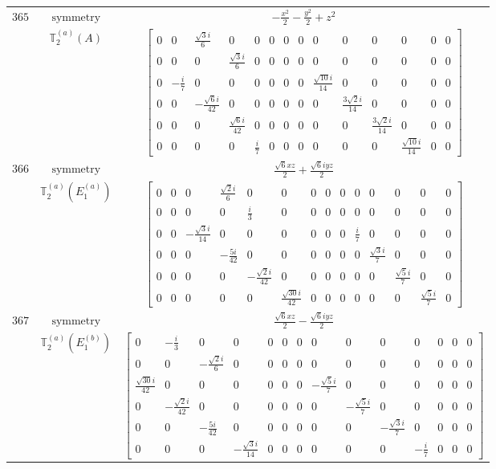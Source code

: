 \documentclass[fleqn,8pt,landscape]{jsarticle}
\begin{document}
\begin{longtable}{ccc}
$ 365 $ & $ \text{symmetry} $ & $ - \frac{x^{2}}{2} - \frac{y^{2}}{2} + z^{2} $ \\
$  $ & $ \mathbb{T}_{2}^{(a)}(A) $ & $ \begin{bmatrix} 0 & 0 & \frac{\sqrt{3} i}{6} & 0 & 0 & 0 & 0 & 0 & 0 & 0 & 0 & 0 & 0 & 0 \\ 0 & 0 & 0 & \frac{\sqrt{3} i}{6} & 0 & 0 & 0 & 0 & 0 & 0 & 0 & 0 & 0 & 0 \\ 0 & - \frac{i}{7} & 0 & 0 & 0 & 0 & 0 & 0 & \frac{\sqrt{10} i}{14} & 0 & 0 & 0 & 0 & 0 \\ 0 & 0 & - \frac{\sqrt{6} i}{42} & 0 & 0 & 0 & 0 & 0 & 0 & \frac{3 \sqrt{2} i}{14} & 0 & 0 & 0 & 0 \\ 0 & 0 & 0 & \frac{\sqrt{6} i}{42} & 0 & 0 & 0 & 0 & 0 & 0 & \frac{3 \sqrt{2} i}{14} & 0 & 0 & 0 \\ 0 & 0 & 0 & 0 & \frac{i}{7} & 0 & 0 & 0 & 0 & 0 & 0 & \frac{\sqrt{10} i}{14} & 0 & 0 \end{bmatrix} $ \\ \hline
$ 366 $ & $ \text{symmetry} $ & $ \frac{\sqrt{6} x z}{2} + \frac{\sqrt{6} i y z}{2} $ \\
$  $ & $ \mathbb{T}_{2}^{(a)}(E_{1}^{(a)}) $ & $ \begin{bmatrix} 0 & 0 & 0 & \frac{\sqrt{2} i}{6} & 0 & 0 & 0 & 0 & 0 & 0 & 0 & 0 & 0 & 0 \\ 0 & 0 & 0 & 0 & \frac{i}{3} & 0 & 0 & 0 & 0 & 0 & 0 & 0 & 0 & 0 \\ 0 & 0 & - \frac{\sqrt{3} i}{14} & 0 & 0 & 0 & 0 & 0 & 0 & \frac{i}{7} & 0 & 0 & 0 & 0 \\ 0 & 0 & 0 & - \frac{5 i}{42} & 0 & 0 & 0 & 0 & 0 & 0 & \frac{\sqrt{3} i}{7} & 0 & 0 & 0 \\ 0 & 0 & 0 & 0 & - \frac{\sqrt{2} i}{42} & 0 & 0 & 0 & 0 & 0 & 0 & \frac{\sqrt{5} i}{7} & 0 & 0 \\ 0 & 0 & 0 & 0 & 0 & \frac{\sqrt{30} i}{42} & 0 & 0 & 0 & 0 & 0 & 0 & \frac{\sqrt{5} i}{7} & 0 \end{bmatrix} $ \\ \hline
$ 367 $ & $ \text{symmetry} $ & $ \frac{\sqrt{6} x z}{2} - \frac{\sqrt{6} i y z}{2} $ \\
$  $ & $ \mathbb{T}_{2}^{(a)}(E_{1}^{(b)}) $ & $ \begin{bmatrix} 0 & - \frac{i}{3} & 0 & 0 & 0 & 0 & 0 & 0 & 0 & 0 & 0 & 0 & 0 & 0 \\ 0 & 0 & - \frac{\sqrt{2} i}{6} & 0 & 0 & 0 & 0 & 0 & 0 & 0 & 0 & 0 & 0 & 0 \\ \frac{\sqrt{30} i}{42} & 0 & 0 & 0 & 0 & 0 & 0 & - \frac{\sqrt{5} i}{7} & 0 & 0 & 0 & 0 & 0 & 0 \\ 0 & - \frac{\sqrt{2} i}{42} & 0 & 0 & 0 & 0 & 0 & 0 & - \frac{\sqrt{5} i}{7} & 0 & 0 & 0 & 0 & 0 \\ 0 & 0 & - \frac{5 i}{42} & 0 & 0 & 0 & 0 & 0 & 0 & - \frac{\sqrt{3} i}{7} & 0 & 0 & 0 & 0 \\ 0 & 0 & 0 & - \frac{\sqrt{3} i}{14} & 0 & 0 & 0 & 0 & 0 & 0 & - \frac{i}{7} & 0 & 0 & 0 \end{bmatrix} $ \\ \hline

\end{longtable}
\end{document}
